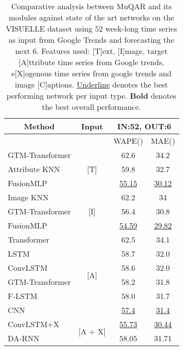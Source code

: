 \documentclass{article}
\begin{document}
\begin{table*}
\centering
  \caption{Comparative analysis between MuQAR and its modules against state of the art networks on the VISUELLE dataset using 52 week-long time series as input from Google Trends and forecasting the next 6. Features used: [T]ext, [I]mage, target [A]ttribute time series from Google trends, e[X]ogenous time series from google trends and image [C]aptions.
  \underline{Underline} denotes the best performing network per input type. \textbf{Bold} denotes the best overall performance.
  }
  \label{tab:results_visuelle}
  \begin{tabular}{l|c|cc}
    \toprule
     \multicolumn{1}{c}{\textbf{Method}} & 
     \multicolumn{1}{c}{\textbf{Input}} & 
     \multicolumn{2}{c}{\textbf{IN:52, OUT:6}}
     \\
     
     \midrule
     & & WAPE() & MAE() \\
     
    \midrule
    GTM-Transformer \cite{skenderi2021well} & \multirow{3}{*}{[T]} & 62.6 & 34.2 \\    
    Attribute KNN \cite{ekambaram2020attention} &  & 59.8 & 32.7 \\
    FusionMLP &  & \underline{55.15} & \underline{30.12} \\
    \midrule
    
    Image KNN \cite{ekambaram2020attention} & \multirow{3}{*}{[I]} & 62.2 & 34 \\
    GTM-Transformer \cite{skenderi2021well} &  & 56.4 & 30.8 \\
    FusionMLP &  & \underline{54.59} & \underline{29.82} \\
    
    \midrule

    Transformer & \multirow{6}{*}{[A]} & 62.5 & 34.1 \\
    LSTM &  & 58.7 & 32.0 \\
    ConvLSTM &  & 58.6 & 32.0 \\    
    
    GTM-Transformer \cite{skenderi2021well} &  & 58.2 & 31.8 \\
    
    F-LSTM & & 58.0 & 31.7 \\
    CNN &  & \underline{57.4} & \underline{31.4} \\
    
    \midrule
    
    ConvLSTM+X & \multirow{2}{*}{[A + X]} & \underline{55.73} & \underline{30.44} \\
    DA-RNN &  & 58.05 & 31.71 \\
        

\end{tabular}
\end{table*}
\end{document}
